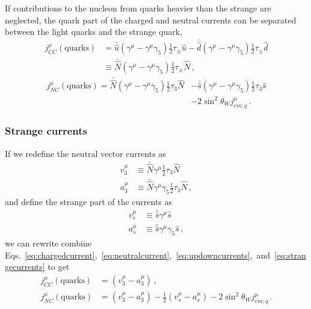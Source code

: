   If contributions to the nucleon from quarks heavier than the strange are
  neglected, the quark part of the charged and neutral currents can be
  separated between the light quarks and the strange
  quark,~\cite{Alberico:2001sd}
  \begin{equation}\label{eq:chargedcurrent}
    \begin{aligned}
    j^{\mu}_{CC}(\textrm{quarks}) &= \bar{\hat{u}}(\gamma^{\mu} 
                - \gamma^{\mu}\gamma_5)\frac{1}{2}\tau_{\pm}\hat{u}
                - \bar{\hat{d}}(\gamma^{\mu} - \gamma^{\mu}\gamma_5)\frac{1}{2}\tau_{\pm}\hat{d} \\
                 &\equiv \bar{\hat{N}}(\gamma^{\mu} 
                - \gamma^{\mu}\gamma_5)\frac{1}{2}\tau_{\pm}\hat{N} \,,
    \end{aligned}
  \end{equation}
  \begin{equation}\label{eq:neutralcurrent}
    \begin{aligned}
    j^{\mu}_{NC}(\textrm{quarks}) = \bar{\hat{N}}(\gamma^{\mu} 
                - \gamma^{\mu}\gamma_5)\frac{1}{2}\tau_3\hat{N} 
                &- \bar{\hat{s}}(\gamma^{\mu} - \gamma^{\mu}\gamma_5)\frac{1}{2}\tau_3\hat{s}  \\
                  &- 2\sin^2\theta_W j^{\mu}_{em;q} \,.
    \end{aligned}
  \end{equation}

  \subsubsection{Strange currents}
    If we redefine the neutral vector currents as
    \begin{equation}\label{eq:updowncurrents}
      \begin{aligned}
        v^{\mu}_3 &\equiv \bar{\hat{N}} \gamma^{\mu}\frac{1}{2}\tau_3 \hat{N} \\
        a^{\mu}_3 &\equiv \bar{\hat{N}} \gamma^{\mu}\gamma_5\frac{1}{2}\tau_3 \hat{N} \,,
      \end{aligned}
    \end{equation}
    and define the strange part of the currents as
    \begin{equation}\label{eq:strangecurrents}
      \begin{aligned}
        v^{\mu}_s &\equiv \bar{\hat{s}} \gamma^{\mu} \hat{s} \\
        a^{\mu}_s &\equiv \bar{\hat{s}} \gamma^{\mu}\gamma_5 \hat{s} \,,
      \end{aligned}
    \end{equation}
    we can rewrite combine
    Eqs.~\ref{eq:chargedcurrent},~\ref{eq:neutralcurrent},~\ref{eq:updowncurrents},~and~\ref{eq:strangecurrents}
    to get
    \begin{align}
      j^{\mu}_{CC}(\textrm{quarks}) &= (v^{\mu}_3 - a^{\mu}_3) \,, \\
      j^{\mu}_{NC}(\textrm{quarks}) &= (v^{\mu}_3 - a^{\mu}_3) 
        - \frac{1}{2}(v^{\mu}_s - a^{\mu}_s) - 2\sin^2\theta_W j^{\mu}_{em;q} \,.
    \end{align}
    
